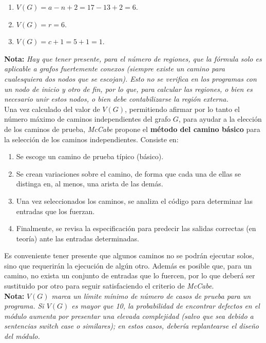 \begin{enumerate}
    \item $V (G) = a-n+2 = 17-13+2 = 6$.
    \item $V (G) = r = 6$.
    \item $V (G) = c+1 = 5+1 = 1$.
\end{enumerate}

\textbf{Nota:} \textit{Hay que tener presente, para el número de regiones, que la fórmula solo es aplicable a grafos fuertemente conexos (siempre existe un camino para cualesquiera dos nodos que se escojan). Esto no se verifica en los programas con un nodo de inicio y otro de fin, por lo que, para calcular las regiones, o bien es necesario unir estos nodos, o bien debe contabilizarse la región externa.}\\

Una vez calculado del valor de $V (G)$, permitiendo afirmar por lo tanto el número máximo de caminos independientes del grafo $G$, para ayudar a la elección de los caminos de prueba, \textit{McCabe} propone el \textbf{método del camino básico} para la selección de los caminos independientes. Consiste en:

\begin{enumerate}
    \item Se escoge un camino de prueba típico (básico).
    \item Se crean variaciones sobre el camino, de forma que cada una de ellas se distinga en, al menos, una arista de las demás.
    \item Una vez seleccionados los caminos, se analiza el código para determinar las entradas que los fuerzan.
    \item Finalmente, se revisa la especificación para predecir las salidas correctas (en teoría) ante las entradas determinadas.
\end{enumerate}

Es conveniente tener presente que algunos caminos no se podrán ejecutar solos, sino que requerirán la ejecución de algún otro. Además es posible que, para un camino, no exista un conjunto de entradas que lo fuercen, por lo que deberá ser sustituido por otro para seguir satisfaciendo el criterio de \textit{McCabe}.\\

\textbf{Nota:} \textit{$V (G)$ marca un límite mínimo de número de casos de prueba para un programa. Si $V (G)$ es mayor que 10, la probabilidad de encontrar defectos en el módulo aumenta por presentar una elevada complejidad (salvo que sea debido a sentencias \textit{switch case} o similares); en estos casos, debería replantearse el diseño del módulo.}


